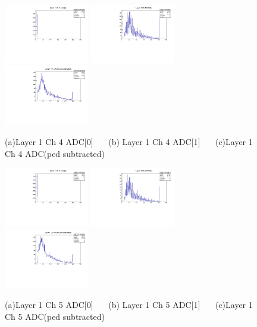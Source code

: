 \documentclass[a4paper,11pt]{article}
\theoremstyle{mytheor}
\begin{document}
\begin{figure}[H] 
\vspace*{-0.3cm} 
\includegraphics[width=0.33\textwidth,scale=0.5,trim=0 0 0 0,clip]{plotsdir/file0_muons-Layer1_Ch4_adc0-1.pdf} 
\includegraphics[width=0.33\textwidth,scale=0.5,trim=0 0 0 0,clip]{plotsdir/file0_muons-Layer1_Ch4_adc1-1.pdf} 
\includegraphics[width=0.33\textwidth,scale=0.5,trim=0 0 0 0,clip]{plotsdir/file0_muons-Layer1_Ch4_adcPedsub-1.pdf} 
\caption{(a)Layer 1 Ch 4 ADC[0] ~~~(b) Layer 1 Ch 4 ADC[1] ~~~(c)Layer 1 Ch 4 ADC(ped subtracted) } 
\end{figure} 
\begin{figure}[H] 
\vspace*{-0.3cm} 
\includegraphics[width=0.33\textwidth,scale=0.5,trim=0 0 0 0,clip]{plotsdir/file0_muons-Layer1_Ch5_adc0-1.pdf} 
\includegraphics[width=0.33\textwidth,scale=0.5,trim=0 0 0 0,clip]{plotsdir/file0_muons-Layer1_Ch5_adc1-1.pdf} 
\includegraphics[width=0.33\textwidth,scale=0.5,trim=0 0 0 0,clip]{plotsdir/file0_muons-Layer1_Ch5_adcPedsub-1.pdf} 
\caption{(a)Layer 1 Ch 5 ADC[0] ~~~(b) Layer 1 Ch 5 ADC[1] ~~~(c)Layer 1 Ch 5 ADC(ped subtracted) } 
\end{figure} 
\end{document}
